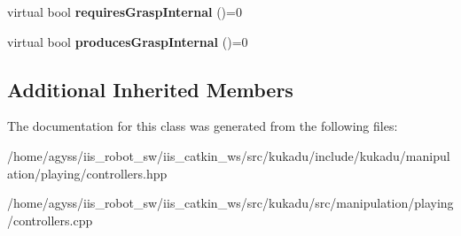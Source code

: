 \begin{DoxyCompactItemize}
\item 
virtual bool {\bfseries requires\+Grasp\+Internal} ()=0\hypertarget{classkukadu_1_1ComplexController_a9e0a9be95895cfdca3181d6c287f1aa1}{}\label{classkukadu_1_1ComplexController_a9e0a9be95895cfdca3181d6c287f1aa1}

\item 
virtual bool {\bfseries produces\+Grasp\+Internal} ()=0\hypertarget{classkukadu_1_1ComplexController_ac4e6cb18f0a2f779a14b9bfae2cc3e7e}{}\label{classkukadu_1_1ComplexController_ac4e6cb18f0a2f779a14b9bfae2cc3e7e}

\end{DoxyCompactItemize}
\subsection*{Additional Inherited Members}


The documentation for this class was generated from the following files\+:\begin{DoxyCompactItemize}
\item 
/home/agyss/iis\+\_\+robot\+\_\+sw/iis\+\_\+catkin\+\_\+ws/src/kukadu/include/kukadu/manipulation/playing/controllers.\+hpp\item 
/home/agyss/iis\+\_\+robot\+\_\+sw/iis\+\_\+catkin\+\_\+ws/src/kukadu/src/manipulation/playing/controllers.\+cpp\end{DoxyCompactItemize}
